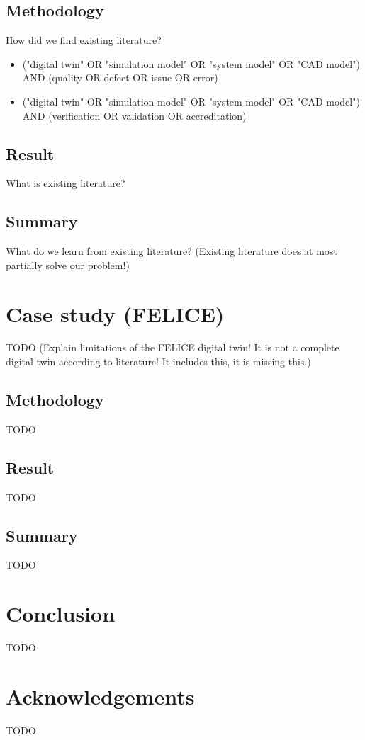 \documentclass[9pt,conference]{IEEEtran}
\begin{document}
    \subsection{Methodology}
    \label{section:liteature_methodology}

    How did we find existing literature?
    
    \begin{itemize}
        \item ("digital twin" OR "simulation model" OR "system model" OR "CAD model") AND (quality OR defect OR issue OR error)
        \item ("digital twin" OR "simulation model" OR "system model" OR "CAD model") AND (verification OR validation OR accreditation)
    \end{itemize}

    \subsection{Result}
    \label{section:liteature_result}

    What is existing literature?

    \subsection{Summary}
    \label{section:liteature_summary}

    What do we learn from existing literature?
    (Existing literature does at most partially solve our problem!)

    \section{Case study (FELICE)}
    \label{section:case}

    TODO (Explain limitations of the FELICE digital twin! It is not a complete digital twin according to literature! It includes this, it is missing this.)

    \subsection{Methodology}
    \label{section:case_methodology}

    TODO

    \subsection{Result}
    \label{section:case_result}

    TODO

    \subsection{Summary}
    \label{section:case_summary}

    TODO

    \section{Conclusion}
    \label{section:conclusion}
    TODO

    \section*{Acknowledgements}
    TODO

    
    
\end{document}
